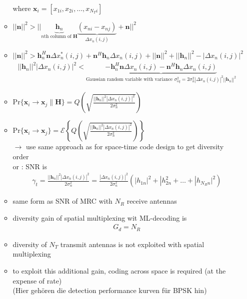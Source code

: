 \documentclass[a4paper, 10pt]{article}
\begin{document}
\begin{itemize}
\begin{itemize}
\begin{align*}
		\end{align*}
		where $\mathbf{x}_i=[x_{1i},x_{2i},\dots,x_{N_Ti}]$
		\item $||\mathbf{n}||^2>||\underbrace{\mathbf{h}_n}_{\text{$n$th column of $\mathbf{H}$}}\underbrace{(x_{ni}-x_{nj})}_{\Delta x_n(i,j)}+\mathbf{n}||^2$
		\item $||\mathbf{n}||^2> \mathbf{h}_n^H\mathbf{n} \Delta x^*_n(i,j)+\mathbf{n}^H\mathbf{h}_n\Delta x_n(i,j)+||\mathbf{n}||^2+||\mathbf{h}_n||^2-|\Delta x_n(i,j)|^2$
		\begin{align*}
			||\mathbf{h}_n||^2|\Delta x_n(i,j)|^2<\underbrace{-\mathbf{h}_n^H\mathbf{n}\Delta x_n(i,j)-\mathbf{n}^H\mathbf{h}_n \Delta x_n(i,j)}_
			{\text{Gaussian random variable with variance $\sigma_{eq}^2=2\sigma_n^2|\Delta x_n(i,j)|^2||\mathbf{h}_n||^2$}}
		\end{align*}
		\item $\mathrm{Pr}\{\mathbf{x}_i\rightarrow \mathbf{x}_j\|\mathbf{H}\}=Q\left(\sqrt{\frac{||\mathbf{h}_n||^2|\Delta x_n(i,j)|^2}{2\sigma_n^2}}\right)$
		\item $\mathrm{Pr}\{\mathbf{x}_i\rightarrow \mathbf{x}_j\}=\mathcal{E}\left\{Q\left(\sqrt{\frac{||\mathbf{h}_n||^2|\Delta x_n(i,j)|^2}{2\sigma_n^2}}\right)\right\}$\\
		$\rightarrow$ use same approach as for space-time code design to get diversity order\\
		or : SNR is 
		\begin{align*}
			\gamma_t = \frac{||\mathbf{h}_n||^2|\Delta x_n(i,j)|^2}{2\sigma_n^2} = \frac{|\Delta x_n(i,j)|^2}{2\sigma_n^2}(|h_{1n}|^2+|h_{2n}^2+\dots+|h_{N_Rn}|^2)
		\end{align*}
		\item same form as SNR of MRC with $N_R$ receive antennas
		\item diversity gain of spatial multiplexing wit ML-decoding is
		\begin{align*}
			G_d=N_R
		\end{align*}
		\item diversity of $N_T$ transmit antennas is not exploited with spatial multiplexing
		\item to exploit this additional gain, coding across space is required (at the expense of rate)\\
			(Hier geh\"oren die detection performance kurven f\"ur BPSK hin)
	\end{itemize}
\end{itemize}
\end{document}
